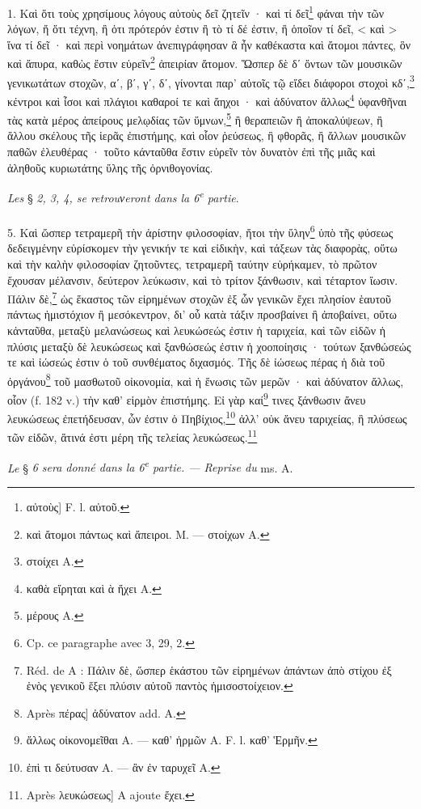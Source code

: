 \documentclass[landscape, a4paper, 11pt, oneside, polutonikogreek, french]{article}
\begin{document}
\bigskip

1. Καὶ ὅτι τοὺς χρησίμους λόγους αὐτοὺς δεῖ ζητεῖν · καὶ τί δεῖ\footnote{αὐτοὺς] F. l. αὐτοῦ.} φάναι τὴν τῶν λόγων, ἤ ὅτι τέχνη, ἢ ὁτι πρότερόν ἐστιν ἢ τὸ τί δέ ἐστιν, ἢ ὁποῖον τί δεῖ, < καὶ > ἵνα τί δεῖ · καὶ περὶ νοημάτων ἀνεπιγράφησαν ἃ ἦν καθέκαστα καὶ ἄτομοι πάντες, ὃν καὶ ἄπυρα, καθὼς ἔστιν εὑρεῖν\footnote{καὶ ἄτομοι πάντως καὶ ἄπειροι. M. --- στοίχων A.} ἀπειρίαν ἄτομον. Ὥσπερ δὲ δʹ ὄντων τῶν μουσικῶν γενικωτάτων στοχῶν, αʹ, βʹ, γʹ, δʹ, γίνονται παρ' αὐτοῖς τῷ εἴδει διάφοροι στοχοὶ κδʹ,\footnote{στοίχει A.} κέντροι καὶ ἶσοι καὶ πλάγιοι καθαροί τε καὶ ἄηχοι · καὶ ἀδύνατον ἄλλως\footnote{καθὰ εἴρηται καὶ ὰ ἤχει A.} ὑφανθῆναι τὰς κατὰ μέρος ἀπείρους μελῳδίας τῶν ὕμνων,\footnote{μέρους A.} ἢ θεραπειῶν ἢ ἀποκαλύψεων, ἢ ἄλλου σκέλους τῆς ἱερᾶς ἐπιστήμης, καὶ οἷον ῥεύσεως, ἢ φθορᾶς, ἢ ἄλλων μουσικῶν παθῶν ἐλευθέρας · τοῦτο κάνταῦθα ἔστιν εὑρεῖν τὸν δυνατὸν ἐπὶ τῆς μιᾶς καὶ ἀληθοῦς κυριωτάτης ὕλης τῆς ὀρνιθογονίας.
\begin{center}
\emph{Les} § \emph{2, 3, 4, se retrouνeront dans la 6\textsuperscript{e} partie}.
\end{center}
\paragraph{}
5. Καὶ ὥσπερ τετραμερῆ τὴν ἀρίστην φιλοσοφίαν, ἤτοι τὴν ὕλην\footnote{Cp. ce paragraphe avec 3, 29, 2.} ὑπὸ τῆς φύσεως δεδειγμένην εὑρίσκομεν τὴν γενικήν τε καὶ εἰδικὴν, καὶ τάξεων τὰς διαφορὰς, οὕτω καὶ τὴν καλὴν φιλοσοφίαν ζητοῦντες, τετραμερῆ ταύτην εὑρήκαμεν, τὸ πρῶτον ἔχουσαν μέλανσιν, δεύτερον λεύκωσιν, καὶ τὸ τρίτον ξάνθωσιν, καὶ τέταρτον ἴωσιν. Πάλιν δὲ,\footnote{Réd. de A : Πάλιν δὲ, ὥσπερ ἑκάστου τῶν εἰρημένων ἁπάντων ἀπὸ στίχου ἐξ ἑνὸς γενικοῦ ἕξει πλύσιν αὐτοῦ παντὸς ἡμισοστοίχειον.} ὡς ἕκαστος τῶν εἰρημένων στοχῶν ἐξ ὧν γενικῶν ἔχει πλησίον ἑαυτοῦ πάντως ἡμιστόχιον ἢ μεσόκεντρον, δι' οὗ κατὰ τάξιν προσβαίνει ἢ ἀποβαίνει, οὕτω κἀνταῦθα, μεταξὺ μελανώσεως καὶ λευκώσεώς ἐστιν ἡ ταριχεία, καὶ τῶν εἰδῶν ἡ πλύσις μεταξὺ δὲ λευκώσεως καὶ ξανθώσεώς ἐστιν ἡ χοοποίησις · τούτων ξανθώσεώς τε καὶ ἰώσεώς ἐστιν ὁ τοῦ συνθέματος διχασμός. Τῆς δὲ ἰώσεως πέρας ἡ διὰ τοῦ ὀργάνου\footnote{Après πέρας] ἀδύνατον add. A.} τοῦ μασθωτοῦ οἰκονομία, καὶ ἡ ἕνωσις τῶν μερῶν · καὶ ἀδύνατον ἄλλως, οἷον (f. 182 v.) τὴν καθ' εἱρμὸν ἐπιστήμης. Εἰ γὰρ καί\footnote{ἄλλως οἰκονομεῖθαι A. --- καθ' ἡρμῶν A. F. l. καθ' Ἑρμῆν.} τινες ξάνθωσιν ἄνευ λευκώσεως ἐπετήδευσαν, ὧν ἐστιν ὁ Πηβίχιος,\footnote{ἐπὶ τι δεύτυσαν A. --- ἂν ἐν ταρυχεῖ A.} ἀλλ' οὐκ ἄνευ ταριχείας, ἢ πλύσεως τῶν εἰδῶν, ἅτινά ἐστι μέρη τῆς τελείας λευκώσεως.\footnote{Après λευκώσεως] A ajoute ἔχει.}
\begin{center}
\emph{Le} § \emph{6 sera donné dans la 6\textsuperscript{e} partie. --- Reprise du} ms. A.
\end{center}
\end{document}
